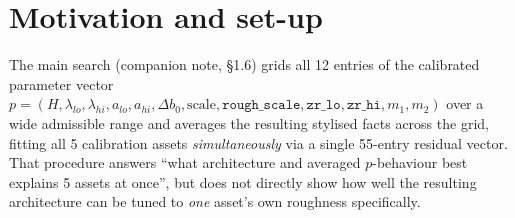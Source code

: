 \documentclass[11pt]{article}
\begin{document}
\tableofcontents

\section{Motivation and set-up}
The main search (companion note, \S1.6) grids all 12 entries of the calibrated
parameter vector $p=(H,\lambda_{lo},\lambda_{hi},a_{lo},a_{hi},\Delta b_0,\text{scale},
\texttt{rough\_scale},\texttt{zr\_lo},\texttt{zr\_hi},m_1,m_2)$ over a wide admissible
range and averages the resulting stylised facts across the grid, fitting all 5
calibration assets \emph{simultaneously} via a single 55-entry residual vector. That
procedure answers ``what architecture and averaged $p$-behaviour best explains 5
assets at once'', but does not directly show how well the resulting architecture can
be tuned to \emph{one} asset's own roughness specifically.
\end{document}
